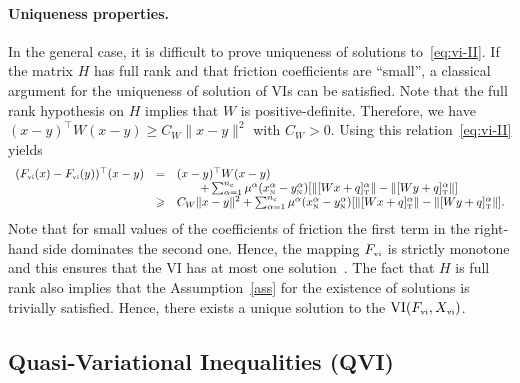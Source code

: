 {\paragraph{{Uniqueness} properties.} 
In the general case, it is difficult to prove uniqueness of solutions to~\eqref{eq:vi-II}.
If the matrix $H$ has full rank and that friction coefficients are ``small'', a classical argument for the uniqueness of solution of VIs can be satisfied.
Note that the full rank hypothesis on $H$ implies that $W$ is positive-definite. Therefore, we have  $(x-y)^\top W (x-y) \geq C_W \|x-y\|^2$ with  $C_W>0$.
Using this relation~\eqref{eq:vi-II} yields
\begin{equation}
  \label{eq:mono-II}
  \begin{array}{rcl}
    (F_{\vitwo}(x)-F_{\vitwo}(y))^\top(x-y) &=& (x-y)^\top W (x-y)  \\
    &  & \quad\quad + \sum _{\alpha =1}^{n_c} \mu^\alpha (x^\alpha_\n-y^\alpha_\n) [\|[Wx+q]^\alpha_\t \| - \|[Wy+q]^\alpha_\t \|] \\
    & \geq & C_W \|x-y\|^2  + \sum _{\alpha =1}^{n_c} \mu^\alpha (x^\alpha_\n-y^\alpha_\n) [\|[Wx+q]^\alpha_\t \| - \|[Wy+q]^\alpha_\t \|].
  \end{array}
\end{equation}
Note that for small values of the coefficients of friction the first term in the right-hand side dominates the second one.
Hence, the mapping $F_{\hbox{\tiny{vi}}}$ is strictly monotone and this ensures that the VI has at most one solution~\citep[Theorem 2.3.3]{Facchinei.Pang2003}. The fact that $H$ is full rank also implies that the Assumption~\eqref{ass} for the existence of solutions is trivially satisfied. {Hence,} there exists a unique solution to the $\mathrm{VI}(F_{{\hbox{\tiny{vi}}}},X_{{\hbox{\tiny{vi}}}})$.


\subsection{Quasi-Variational Inequalities (QVI)}

}
